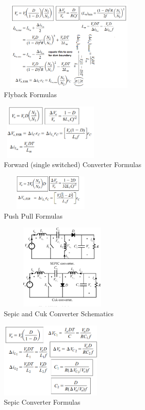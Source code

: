 \documentclass[twocolumn, ]{article}
\begin{document}
\begin{figure}[!ht]
	\includegraphics[width=2.8in,height=1.8in]{flybackformulasfromhart.png}
	\caption{Flyback Formulas}
\end{figure}
\begin{figure}[!ht]
	\includegraphics[width=2in,height=1.1in]{forwardsingleswitch.png}
	\caption{Forward (single switched) Converter Formulas}
\end{figure}
\begin{figure}[!ht]
	\includegraphics[width=2in,height=0.7in]{pushpull_someformulas.png}
	\caption{Push Pull Formulas}
\end{figure}
\begin{figure}[!ht]
	\includegraphics[width=2.5in,height=1.7in]{sepic_and_cuk_schematic.png}
	\caption{Sepic and Cuk Converter Schematics}
\end{figure}
\begin{figure}[!ht]
	\includegraphics[width=2in,height=1.5in]{sepicformulas.png}
	\caption{Sepic Converter Formulas}
\end{figure}
\end{document}
